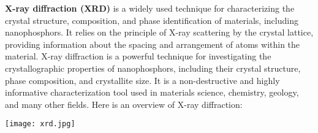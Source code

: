 \documentclass[../characterization.tex]{subfiles}
\begin{document}
    \textbf{X-ray diffraction (XRD)}\cite{b11} is a widely used technique for characterizing the crystal structure, composition, and 
    phase identification of materials, including nanophosphors. It relies on the principle of X-ray scattering by 
    the crystal lattice, providing information about the spacing and arrangement of atoms within the material.
    X-ray diffraction is a powerful technique for investigating the crystallographic properties of nanophosphors, 
    including their crystal structure, phase composition, and crystallite size. It is a non-destructive and highly 
    informative characterization tool used in materials science, chemistry, geology, and many other fields. 
    Here is an overview of X-ray diffraction:
    \begin{Figure}
        \centering
        \texttt{[image: xrd.jpg]}
        \label{fig:xrd}
    \end{Figure}
\end{document}
